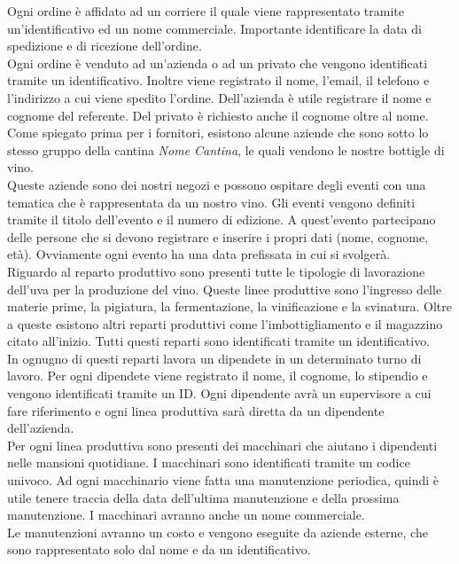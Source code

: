 Ogni ordine è affidato ad un corriere il quale viene rappresentato tramite un'identificativo ed un nome commerciale. Importante identificare la data  di spedizione e di ricezione dell'ordine.\\
Ogni ordine è venduto ad un'azienda o ad un privato che vengono identificati tramite un identificativo. Inoltre viene registrato il nome, l'email, il telefono e l'indirizzo a cui viene spedito l'ordine. Dell'azienda è utile registrare il nome e cognome del referente. Del privato è richiesto anche il cognome oltre al nome. Come spiegato prima per i fornitori, esistono alcune aziende che sono sotto lo stesso gruppo della cantina \emph{Nome Cantina}, le quali vendono le nostre bottigle di vino.\\
Queste aziende sono dei nostri negozi e possono ospitare degli eventi con una tematica che è rappresentata da un nostro vino. Gli eventi vengono definiti tramite il titolo dell'evento e il numero di edizione. A quest'evento partecipano delle persone che si devono registrare e inserire i propri dati (nome, cognome, età). Ovviamente ogni evento ha una data prefissata in cui si svolgerà.\\
Riguardo al reparto produttivo sono presenti tutte le tipologie di lavorazione dell'uva per la produzione del vino. Queste linee produttive sono l'ingresso delle materie prime, la pigiatura, la fermentazione, la vinificazione e la svinatura. Oltre a queste esistono altri reparti produttivi come l'imbottigliamento e il magazzino citato all'inizio. Tutti questi reparti sono identificati tramite un identificativo.\\
In ognugno di questi reparti lavora un dipendete in un determinato turno di lavoro. Per ogni dipendete viene registrato il nome, il cognome, lo stipendio e vengono identificati tramite un ID. Ogni dipendente avrà un supervisore a cui fare riferimento e ogni linea produttiva sarà diretta da un dipendente dell'azienda.\\
Per ogni linea produttiva sono presenti dei macchinari che aiutano i dipendenti nelle mansioni quotidiane. I macchinari sono identificati tramite un codice univoco. Ad ogni macchinario viene fatta una manutenzione periodica, quindi è utile tenere traccia della data dell'ultima manutenzione e della prossima manutenzione. I macchinari avranno anche un nome commerciale.\\
Le manutenzioni avranno un costo e vengono eseguite da aziende esterne, che sono rappresentato solo dal nome e da un identificativo.